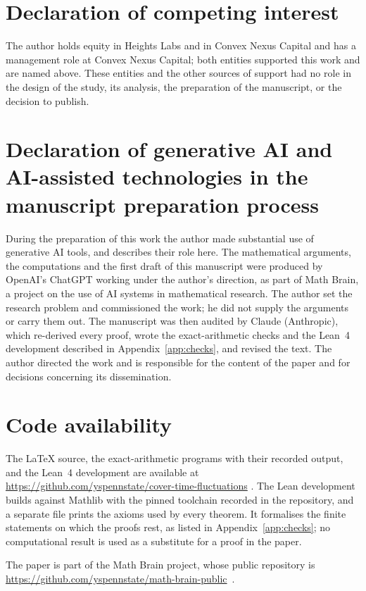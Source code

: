 \documentclass[11pt]{amsart}
\theoremstyle{remark}
\numberwithin{equation}{section}
\begin{document}
\section*{Declaration of competing interest}
The author holds equity in Heights Labs and in Convex Nexus Capital and has a management role at Convex Nexus Capital; both entities supported this work and are named above. These entities and the other sources of support had no role in the design of the study, its analysis, the preparation of the manuscript, or the decision to publish.

\section*{Declaration of generative AI and AI-assisted technologies in the manuscript preparation process}
During the preparation of this work the author made substantial use of generative AI tools, and describes their role here. The mathematical arguments, the computations and the first draft of this manuscript were produced by OpenAI's ChatGPT working under the author's direction, as part of Math Brain, a project on the use of AI systems in mathematical research. The author set the research problem and commissioned the work; he did not supply the arguments or carry them out. The manuscript was then audited by Claude (Anthropic), which re-derived every proof, wrote the exact-arithmetic checks and the Lean~4 development described in Appendix~\ref{app:checks}, and revised the text. The author directed the work and is responsible for the content of the paper and for decisions concerning its dissemination.

\section*{Code availability}
The \LaTeX{} source, the exact-arithmetic programs with their recorded output, and the Lean~4 development are available at \url{https://github.com/yspennstate/cover-time-fluctuations} \cite{Repo}. The Lean development builds against Mathlib with the pinned toolchain recorded in the repository, and a separate file prints the axioms used by every theorem. It formalises the finite statements on which the proofs rest, as listed in Appendix~\ref{app:checks}; no computational result is used as a substitute for a proof in the paper.

The paper is part of the Math Brain project, whose public repository is \url{https://github.com/yspennstate/math-brain-public}~\cite{MathBrainRepo}.
\end{document}
